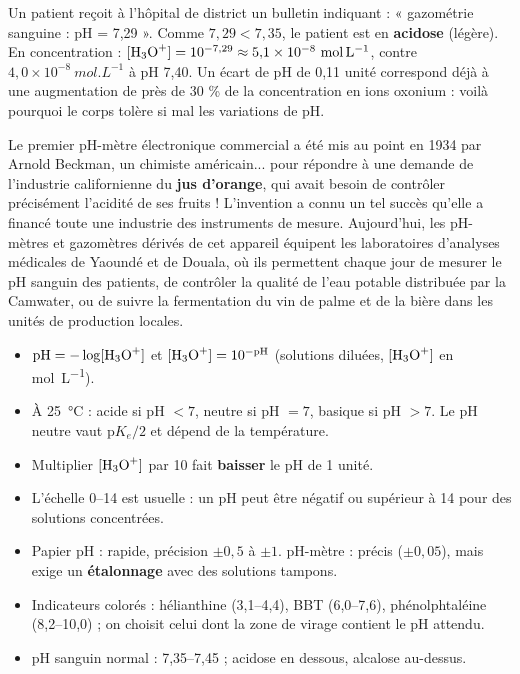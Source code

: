 \documentclass[11pt]{article}
\begin{document}
\begin{exemplebox}
Un patient reçoit à l'hôpital de district un bulletin indiquant : « gazométrie sanguine : pH = 7,29 ». Comme $7{,}29 < 7{,}35$, le patient est en \textbf{acidose} (légère). En concentration : $[\ce{H3O+}] = 10^{-7{,}29} \approx 5{,}1\times 10^{-8}\ \si{mol.L^{-1}}$, contre $4{,}0\times 10^{-8}\ \si{mol.L^{-1}}$ à pH 7,40. Un écart de pH de 0,11 unité correspond déjà à une augmentation de près de 30 \% de la concentration en ions oxonium : voilà pourquoi le corps tolère si mal les variations de pH.
\end{exemplebox}

\begin{savaistu}
Le premier pH-mètre électronique commercial a été mis au point en 1934 par Arnold Beckman, un chimiste américain... pour répondre à une demande de l'industrie californienne du \textbf{jus d'orange}, qui avait besoin de contrôler précisément l'acidité de ses fruits ! L'invention a connu un tel succès qu'elle a financé toute une industrie des instruments de mesure. Aujourd'hui, les pH-mètres et gazomètres dérivés de cet appareil équipent les laboratoires d'analyses médicales de Yaoundé et de Douala, où ils permettent chaque jour de mesurer le pH sanguin des patients, de contrôler la qualité de l'eau potable distribuée par la Camwater, ou de suivre la fermentation du vin de palme et de la bière dans les unités de production locales.
\end{savaistu}

\begin{aretenir}
\begin{itemize}
\item $\mathrm{pH} = -\log[\ce{H3O+}]$ et $[\ce{H3O+}] = 10^{-\mathrm{pH}}$ (solutions diluées, $[\ce{H3O+}]$ en \si{mol.L^{-1}}).
\item À \SI{25}{\celsius} : acide si pH $< 7$, neutre si pH $= 7$, basique si pH $> 7$. Le pH neutre vaut $\mathrm{p}K_e/2$ et dépend de la température.
\item Multiplier $[\ce{H3O+}]$ par 10 fait \textbf{baisser} le pH de 1 unité.
\item L'échelle 0--14 est usuelle : un pH peut être négatif ou supérieur à 14 pour des solutions concentrées.
\item Papier pH : rapide, précision $\pm 0{,}5$ à $\pm 1$. pH-mètre : précis ($\pm 0{,}05$), mais exige un \textbf{étalonnage} avec des solutions tampons.
\item Indicateurs colorés : hélianthine (3,1--4,4), BBT (6,0--7,6), phénolphtaléine (8,2--10,0) ; on choisit celui dont la zone de virage contient le pH attendu.
\item pH sanguin normal : 7,35--7,45 ; acidose en dessous, alcalose au-dessus.
\end{itemize}
\end{aretenir}
\end{document}
